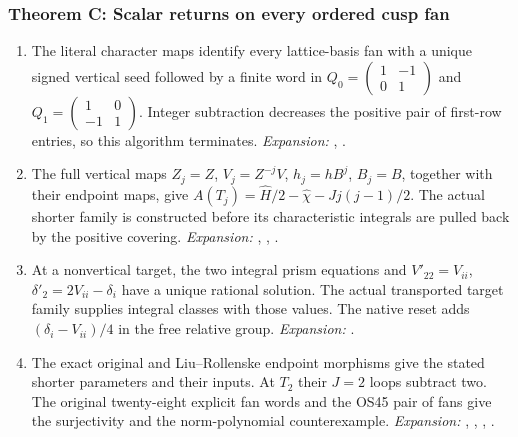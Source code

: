 \hypertarget{outline-IV-C}{}
\subsubsection*{Theorem C: Scalar returns on every ordered cusp fan}
\begin{enumerate}[label=\arabic*.,leftmargin=*]

\item\hypertarget{step-IV-C-1}{} The literal character maps identify every lattice-basis fan
with a unique signed vertical seed followed by a finite word in
$Q_0=\left(\begin{smallmatrix}1&-1\\0&1\end{smallmatrix}\right)$
and $Q_1=\left(\begin{smallmatrix}1&0\\-1&1\end{smallmatrix}\right)$.
Integer subtraction decreases the positive pair of first-row entries,
so this algorithm terminates.
\textit{Expansion:} , .

\item\hypertarget{step-IV-C-2}{} The full vertical maps $Z_j=Z$, $V_j=Z^{-j}V$,
$h_j=hB^j$, $B_j=B$, together with their endpoint maps, give
$A(T_j)=\widehat H/2-\widehat\chi-Jj(j-1)/2$. The actual shorter
family is constructed before its characteristic integrals are
pulled back by the positive covering.
\textit{Expansion:} , , .

\item\hypertarget{step-IV-C-3}{} At a nonvertical target, the two integral prism equations and
$V'_{22}=V_{ii}$, $\delta'_2=2V_{ii}-\delta_i$ have a unique
rational solution. The actual transported target family supplies
integral classes with those values. The native reset adds
$(\delta_i-V_{ii})/4$ in the free relative group.
\textit{Expansion:} .

\item\hypertarget{step-IV-C-4}{} The exact original and Liu--Rollenske endpoint morphisms give
the stated shorter parameters and their inputs. At $T_2$ their
$J=2$ loops subtract two. The original twenty-eight explicit fan
words and the OS45 pair of fans give the surjectivity and the
norm-polynomial counterexample.
\textit{Expansion:} , , , .


\end{enumerate}
